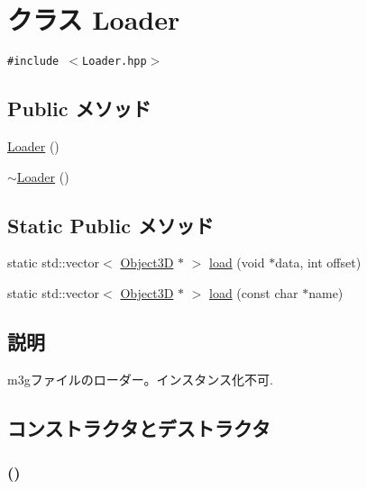 \hypertarget{classm3g_1_1Loader}{
\section{クラス Loader}
\label{classm3g_1_1Loader}
}
{\tt \#include $<$Loader.hpp$>$}

\subsection*{Public メソッド}
\begin{CompactItemize}
\item 
\hyperlink{classm3g_1_1Loader_c082256071478316a982894d4191a11a}{Loader} ()
\item 
\hyperlink{classm3g_1_1Loader_8bd25dd3f34914f06852c2de2f9db737}{$\sim$Loader} ()
\end{CompactItemize}
\subsection*{Static Public メソッド}
\begin{CompactItemize}
\item 
static std::vector$<$ \hyperlink{classm3g_1_1Object3D}{Object3D} $\ast$ $>$ \hyperlink{classm3g_1_1Loader_7abddd36a9ee70e67de0e2183bba1aed}{load} (void $\ast$data, int offset)
\item 
static std::vector$<$ \hyperlink{classm3g_1_1Object3D}{Object3D} $\ast$ $>$ \hyperlink{classm3g_1_1Loader_27bd86888cdadd349223dcb303e45879}{load} (const char $\ast$name)
\end{CompactItemize}


\subsection{説明}
m3gファイルのローダー。インスタンス化不可. 

\subsection{コンストラクタとデストラクタ}
\hypertarget{classm3g_1_1Loader_c082256071478316a982894d4191a11a}{
\subsubsection[{Loader}]{ ()}}
\label{classm3g_1_1Loader_c082256071478316a982894d4191a11a}


